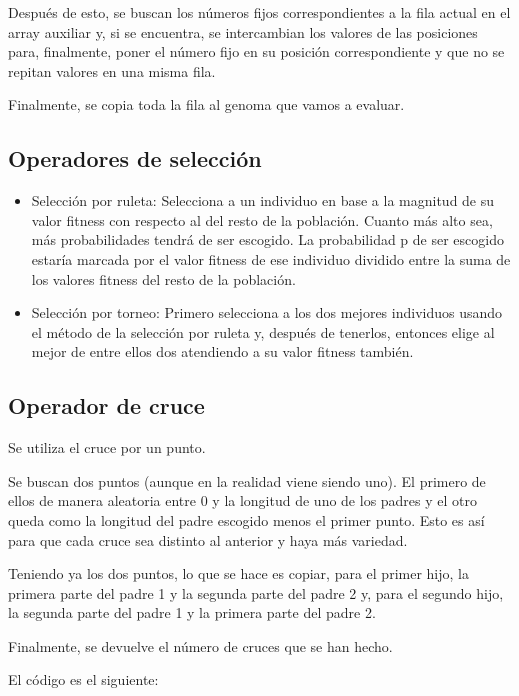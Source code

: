 \documentclass[a4,11pt]{article}
\begin{document}
Después de esto, se buscan los números fijos correspondientes a la fila actual en el array auxiliar y, si se encuentra, se intercambian los valores de las posiciones para, finalmente, poner el número fijo en su posición correspondiente y que no se repitan valores en una misma fila.
 
Finalmente, se copia toda la fila al genoma que vamos a evaluar.

\subsection{Operadores de selección}\label{des:ops}

\begin{itemize}
\item Selección por ruleta: Selecciona a un individuo en base a la magnitud de su valor fitness con respecto al del resto de la población. Cuanto más alto sea, más probabilidades tendrá de ser escogido. 
La probabilidad p de ser escogido estaría marcada por el valor fitness de ese individuo dividido entre la suma de los valores fitness del resto de la población.


\item Selección por torneo: Primero selecciona a los dos mejores individuos usando el método de la selección por ruleta y, después de tenerlos, entonces elige al mejor de entre ellos dos atendiendo a su valor fitness también.
\end{itemize}

\subsection{Operador de cruce}\label{des:cruce}

Se utiliza el cruce por un punto.
 
Se buscan dos puntos (aunque en la realidad viene siendo uno). El primero de ellos de manera aleatoria entre 0 y la longitud de uno de los padres y el otro queda como la longitud del padre escogido menos el primer punto. Esto es así para que cada cruce sea distinto al anterior y haya más variedad.
 
Teniendo ya los dos puntos, lo que se hace es copiar, para el primer hijo, la primera parte del padre 1 y la segunda parte del padre 2 y, para el segundo hijo, la segunda parte del padre 1 y la primera parte del padre 2.

Finalmente, se devuelve el número de cruces que se han hecho.

El código es el siguiente:
\end{document}
